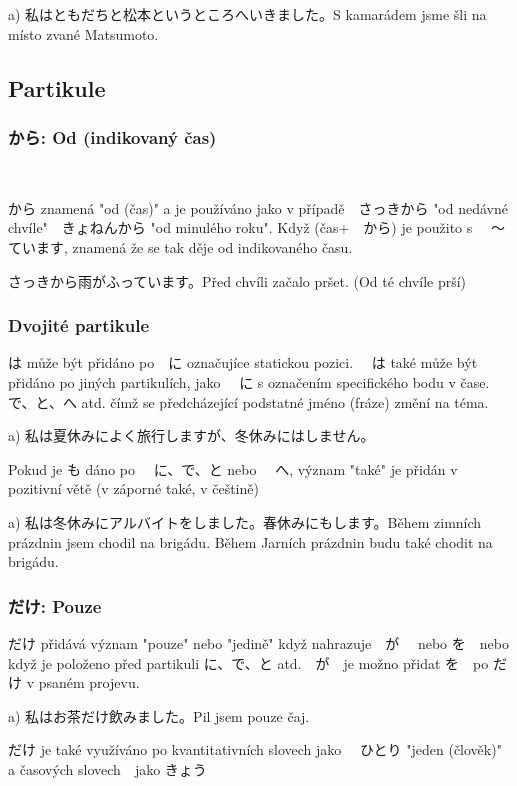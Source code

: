a) 私はともだちと松本というところへいきました。S kamarádem jsme šli na místo zvané Matsumoto.

\subsection{Partikule}
\subsubsection{から: Od (indikovaný čas)}　

から znamená "od (čas)" a je používáno jako v případě　さっきから "od nedávné chvíle"　きょねんから "od minulého roku".  Když (čas+　から) je použito s 　〜ています, znamená že se tak děje od indikovaného času.　


さっきから雨がふっています。Před chvíli začalo pršet. (Od té chvíle prší)



\subsubsection{Dvojité partikule}
は může být přidáno po　に označujíce statickou pozici. 　は také může být přidáno po jiných partikulích, jako 　に s označením specifického bodu v čase.　で、と、へ  atd. čímž se předcházející podstatné jméno (fráze) změní na téma.


a) 私は夏休みによく旅行しますが、冬休みにはしません。


Pokud je も dáno po 　に、で、と nebo 　へ, význam "také" je přidán v pozitivní větě (v záporné také, v češtině)


a) 私は冬休みにアルバイトをしました。春休みにもします。Během zimních prázdnin jsem chodil na brigádu. Během Jarních prázdnin budu také chodit na brigádu.


\subsubsection{だけ: Pouze}

だけ přidává význam "pouze" nebo "jedině" když nahrazuje　が　 nebo を　nebo když je položeno před partikuli に、で、と atd.　が　je možno přidat を　po だけ v psaném projevu.

a) 私はお茶だけ飲みました。Pil jsem pouze čaj.

だけ je také využíváno po kvantitativních slovech jako 　ひとり "jeden (člověk)" a časových slovech　jako きょう　　

